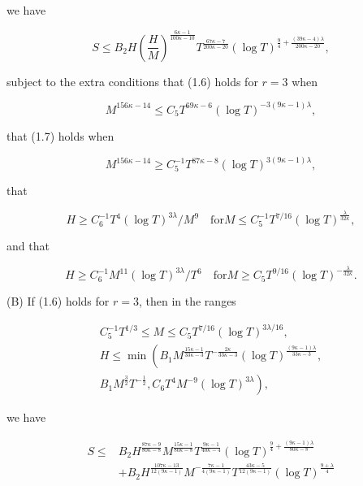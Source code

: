 \documentclass[10pt]{article}
\begin{document}
we have


\begin{equation*}
S \leqslant B_{2} H\left(\frac{H}{M}\right)^{\frac{6 \kappa-1}{100 \kappa-10}} T^{\frac{67 \kappa-7}{200 \kappa-20}}(\log T)^{\frac{9}{4}+\frac{(39 \kappa-4) \lambda}{200 \kappa-20}}, \tag{1.10}
\end{equation*}


subject to the extra conditions that (1.6) holds for $r=3$ when


\begin{equation*}
M^{156 \kappa-14} \leqslant C_{5} T^{69 \kappa-6}(\log T)^{-3(9 \kappa-1) \lambda}, \tag{1.11}
\end{equation*}


that (1.7) holds when


\begin{equation*}
M^{156 \kappa-14} \geqslant C_{5}^{-1} T^{87 \kappa-8}(\log T)^{3(9 \kappa-1) \lambda}, \tag{1.12}
\end{equation*}


that


\begin{equation*}
H \geqslant C_{6}^{-1} T^{4}(\log T)^{3 \lambda} / M^{9} \quad \text{for} M \leqslant C_{5}^{-1} T^{7 / 16}(\log T)^{\frac{\lambda}{32\kappa}}, \tag{1.13}
\end{equation*}


and that


\begin{equation*}
H \geqslant C_{6}^{-1} M^{11}(\log T)^{3 \lambda} / T^{6} \quad \text{for} M \geqslant C_{5} T^{9 / 16}(\log T)^{-\frac{\lambda}{32\kappa}}. \tag{1.14}
\end{equation*}


(B) If (1.6) holds for $r=3$, then in the ranges

\begin{gather*}
C_{5}^{-1} T^{1 / 3} \leqslant M \leqslant C_{5} T^{7 / 16}(\log T)^{3 \lambda / 16},  \tag{1.15}\\
H \leqslant \min \left(B_{1} M^{\frac{15 \kappa-1}{33 \kappa-3}} T^{-\frac{2 \kappa}{33 \kappa-3}}(\log T)^{\frac{(9 \kappa-1) \lambda}{33 \kappa-3}},\right. \\
\left.B_{1} M^{\frac{3}{2}} T^{-\frac{1}{2}}, C_{6} T^{4} M^{-9}(\log T)^{3 \lambda}\right), \tag{1.16}
\end{gather*}

we have

\begin{align*}
S \leqslant & B_{2} H^{\frac{87 \kappa-9}{80 \kappa-8}} M^{\frac{15 \kappa-1}{80 \kappa-8}} T^{\frac{9 \kappa-1}{40 \kappa-4}}(\log T)^{\frac{9}{4}+\frac{(9 \kappa-1) \lambda}{80 \kappa-8}} \\
& +B_{2} H^{\frac{107 \kappa-13}{12(9 \kappa-1)}} M^{-\frac{7 \kappa-1}{4(9 \kappa-1)}} T^{\frac{43 \kappa-5}{12(9 \kappa-1)}}(\log T)^{\frac{9+\lambda}{4}} \tag{1.17}
\end{align*}
\end{document}

